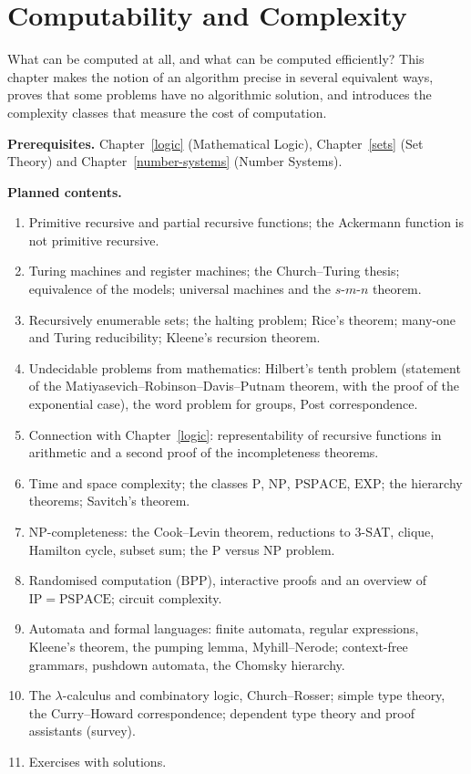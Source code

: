 \chapter{Computability and Complexity}\label{computability-and-complexity}

What can be computed at all, and what can be computed efficiently? This chapter makes the notion of an
algorithm precise in several equivalent ways, proves that some problems have no algorithmic solution, and
introduces the complexity classes that measure the cost of computation.

\noindent\textbf{Prerequisites.} Chapter~\ref{logic} (Mathematical Logic), Chapter~\ref{sets} (Set Theory) and Chapter~\ref{number-systems} (Number Systems).

\noindent\textbf{Planned contents.}
\begin{enumerate}
\item Primitive recursive and partial recursive functions; the Ackermann function is not primitive recursive.
\item Turing machines and register machines; the Church--Turing thesis; equivalence of the models; universal machines and the $s$-$m$-$n$ theorem.
\item Recursively enumerable sets; the halting problem; Rice's theorem; many-one and Turing reducibility; Kleene's recursion theorem.
\item Undecidable problems from mathematics: Hilbert's tenth problem (statement of the Matiyasevich--Robinson--Davis--Putnam theorem, with the proof of the exponential case), the word problem for groups, Post correspondence.
\item Connection with Chapter~\ref{logic}: representability of recursive functions in arithmetic and a second proof of the incompleteness theorems.
\item Time and space complexity; the classes $\mathrm{P}$, $\mathrm{NP}$, $\mathrm{PSPACE}$, $\mathrm{EXP}$; the hierarchy theorems; Savitch's theorem.
\item $\mathrm{NP}$-completeness: the Cook--Levin theorem, reductions to 3-SAT, clique, Hamilton cycle, subset sum; the $\mathrm{P}$ versus $\mathrm{NP}$ problem.
\item Randomised computation ($\mathrm{BPP}$), interactive proofs and an overview of $\mathrm{IP} = \mathrm{PSPACE}$; circuit complexity.
\item Automata and formal languages: finite automata, regular expressions, Kleene's theorem, the pumping lemma, Myhill--Nerode; context-free grammars, pushdown automata, the Chomsky hierarchy.
\item The $\lambda$-calculus and combinatory logic, Church--Rosser; simple type theory, the Curry--Howard correspondence; dependent type theory and proof assistants (survey).
\item Exercises with solutions.
\end{enumerate}
